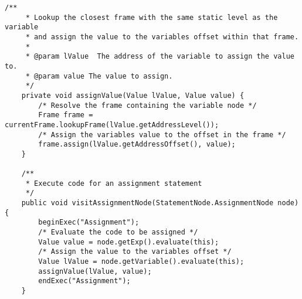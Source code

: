 \documentclass[a4paper,twoside]{article}
\begin{document}
\begin{figure*}[ht]
\begin{lstlisting}[caption=Interpreter for an assignment statement, label=visitAssignmentNode]
    /**
     * Lookup the closest frame with the same static level as the variable
     * and assign the value to the variables offset within that frame.
     *
     * @param lValue  The address of the variable to assign the value to.
     * @param value The value to assign.
     */
    private void assignValue(Value lValue, Value value) {
        /* Resolve the frame containing the variable node */
        Frame frame = currentFrame.lookupFrame(lValue.getAddressLevel());
        /* Assign the variables value to the offset in the frame */
        frame.assign(lValue.getAddressOffset(), value);
    }
    
    /**
     * Execute code for an assignment statement
     */
    public void visitAssignmentNode(StatementNode.AssignmentNode node) {
        beginExec("Assignment");
        /* Evaluate the code to be assigned */
        Value value = node.getExp().evaluate(this);
        /* Assign the value to the variables offset */
        Value lValue = node.getVariable().evaluate(this);
        assignValue(lValue, value);
        endExec("Assignment");
    }    
\end{lstlisting}

\end{figure*}
\end{document}
